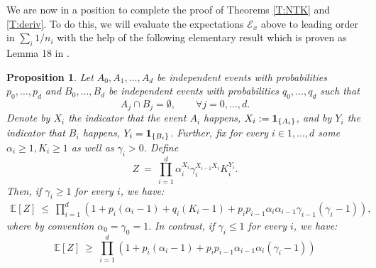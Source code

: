 \documentclass[11pt, reqno]{amsart}
\newtheorem{proposition}[theorem]{Proposition}
\begin{document}
We are now in a position to complete the proof of Theorems \ref{T:NTK} and \ref{T:deriv}. To do this, we will evaluate the expectations $\mathcal E_x$ above to leading order in $\sum_i 1/n_i$ with the help of the following elementary result which is proven as Lemma 18 in \cite{hanin2018products}. 
\begin{proposition}\label{P:elementary}
\label{lem:classic_probability}Let $A_{0},A_{1},\ldots,A_{d}$ be independent
events with probabilities $p_{0},\ldots,p_{d}$ and $B_0,\ldots, B_d$ be independent events with probabilities $q_0,\ldots,q_d$ such that
\[A_j\cap B_j=\emptyset,\qquad \forall j=0,\ldots,d.\]
Denote by $X_{i}$ the indicator that the event $A_{i}$ happens, $X_{i}:={\bf 1}_{\left\{ A_{i}\right\}} $, and by $Y_i$ the indicator that $B_i$ happens, $Y_i={\bf 1}_{\{B_i\}}$. Further, fix for every $i\in 1,\ldots,d$ some $\alpha_i \geq 1,K_i\geq 1$ as well as $\gamma_i>0$. Define
\[Z~=~ \prod_{i=1}^d \alpha_i^{X_i}\gamma_i^{X_{i-1}X_i}K_i^{Y_i}.\]
Then, if $\gamma_i\geq1$ for every $i$, we have:
\begin{align}
\mathbb  E\left[Z\right]~\leq~\prod_{i=1}^d\left(1+p_i(\alpha_i-1)+q_i(K_i-1)+p_ip_{i-1}\alpha_i\alpha_{i-1}\gamma_{i-1}(\gamma_{i}-1)\right)\label{eq:ineq_1},
\end{align}
where by convention $\alpha_0=\gamma_0=1.$ In contrast, if $\gamma_i\leq 1$ for every $i$, we have:
\begin{equation}
\mathbb E[Z]~\geq~  \prod_{i=1}^d\left(1+p_i(\alpha_i-1)+p_ip_{i-1}\alpha_{i-1} \alpha_i(\gamma_i-1)\right)\label{eq:ineq_2}
\end{equation}
\end{proposition}
\end{document}
